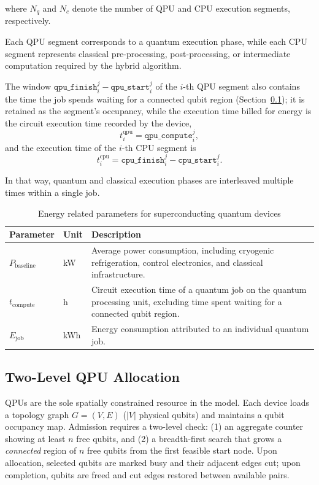 where $N_q$ and $N_c$ denote the number of QPU and CPU execution segments, respectively.  

Each QPU segment corresponds to a quantum execution phase, while each CPU segment represents classical pre-processing, post-processing, or intermediate computation required by the hybrid algorithm.

The window $\texttt{qpu\_finish}_i^j - \texttt{qpu\_start}_i^j$ of the $i$-th QPU segment also contains the time the job spends waiting for a connected qubit region (Section~\ref{sec:arch-qpu}); it is retained as the segment's occupancy, while the execution time billed for energy is the circuit execution time recorded by the device,
\[
t^{\text{qpu}}_i = \texttt{qpu\_compute}_i^j,
\]
and the execution time of the $i$-th CPU segment is
\[
t^{\text{cpu}}_i = \texttt{cpu\_finish}_i^j - \texttt{cpu\_start}_i^j.
\]

In that way, quantum and classical execution phases are interleaved multiple times within a single job.

\begin{table}[t]
\centering
\caption{Energy related parameters for superconducting quantum devices}
\label{tab:qcloudsim_energy_params}
\begin{tabular}{llp{5cm}}
\toprule
\textbf{Parameter} & \textbf{Unit} & \textbf{Description} \\
\midrule
$P_{\text{baseline}}$ & kW & Average power consumption, including cryogenic refrigeration, control electronics, and classical infrastructure. \\
$t_{\text{compute}}$ & h & Circuit execution time of a quantum job on the quantum processing unit, excluding time spent waiting for a connected qubit region. \\
$E_{\text{job}}$ & kWh & Energy consumption attributed to an individual quantum job. \\
\bottomrule
\end{tabular}
\end{table}

\subsection{Two-Level QPU Allocation}
\label{sec:arch-qpu}

QPUs are the sole spatially constrained resource in the model. Each device loads a topology graph $G=(V,E)$ ($|V|$ physical qubits) and maintains a qubit occupancy map. Admission requires a two-level check: (1) an aggregate counter showing at least $n$ free qubits, and (2) a breadth-first search that grows a \emph{connected} region of $n$ free qubits from the first feasible start node. Upon allocation, selected qubits are marked busy and their adjacent edges cut; upon completion, qubits are freed and cut edges restored between available pairs.

